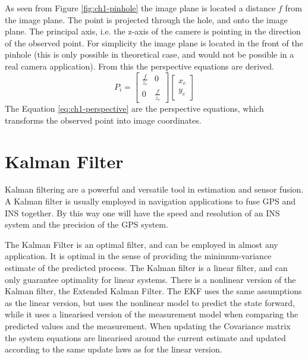 	As seen from Figure \ref{fig:ch1-pinhole} the image plane is located a distance $f$ from the image plane. 
	The point is projected through the hole, and onto the image plane. The principal axis, i.e. the z-axis of the
	camere is pointing
	in the direction of the observed point. For simplicity the image plane is located in the front of the
	pinhole (this is only possible in theoretical case, and would not be possible in a real camera application).
From	this the
	perspective equations are derived. \cite{robotbok}
	\begin{equation}
		\label{eq:ch1-perspective}
		P_i = \left[ \begin{array}{cc}
					\frac{f}{z_c} & 0 \\
					0	& \frac{f}{z_c} 
				\end{array} \right] 
				\left[ \begin{array}{c}
					x_c \\
					y_c
					\end{array} \right]
	\end{equation}
	The Equation \eqref{eq:ch1-perspective} are the perspective equations, which transforms the observed 
	point into image coordinates. 

\section{Kalman Filter}
	Kalman filtering are a powerful and versatile tool in estimation and sensor fusion. A Kalman filter is
	usually employed in navigation applications to fuse GPS and INS together. By this way one will have
	the speed and resolution of an INS system and the precision of the GPS system.
	
	The Kalman Filter is an optimal filter, and can be employed in almost any application. It is optimal in 
	the sense of providing the minimum-variance estimate of the predicted process.  The Kalman 
	filter is a linear filter, and can only
	guarantee optimality for linear systems. There is a nonlinear version of the Kalman filter, the
	Extended Kalman Filter. The EKF uses the same assumptions as the linear version, but uses the nonlinear
	model to predict the state forward, while it uses a linearised version of the measurement model when comparing
	the predicted values and the measurement. 
	When updating the Covariance matrix the system equations are linearised around the current estimate 
	and updated according to the same update laws as for the linear version. \cite{kalman}
	
